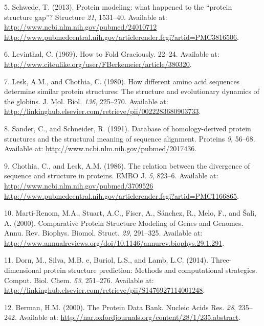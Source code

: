 \documentclass[11pt,a4paper,twoside]{book}
\theoremstyle{definition}
\theoremstyle{definition}
\theoremstyle{remark}
\begin{document}
\hypertarget{ref-Schwede2013}{}
5. Schwede, T. (2013). Protein modeling: what happened to the ``protein
structure gap''? Structure \emph{21}, 1531--40. Available at:
\href{http://www.ncbi.nlm.nih.gov/pubmed/24010712\%20http://www.pubmedcentral.nih.gov/articlerender.fcgi?artid=PMC3816506}{http://www.ncbi.nlm.nih.gov/pubmed/24010712 http://www.pubmedcentral.nih.gov/articlerender.fcgi?artid=PMC3816506}.

\hypertarget{ref-Levinthal1969}{}
6. Levinthal, C. (1969). How to Fold Graciously. 22--24. Available at:
\url{http://www.citeulike.org/user/FBerkemeier/article/380320}.

\hypertarget{ref-Lesk1980}{}
7. Lesk, A.M., and Chothia, C. (1980). How different amino acid
sequences determine similar protein structures: The structure and
evolutionary dynamics of the globins. J. Mol. Biol. \emph{136},
225--270. Available at:
\url{http://linkinghub.elsevier.com/retrieve/pii/0022283680903733}.

\hypertarget{ref-Sander1991}{}
8. Sander, C., and Schneider, R. (1991). Database of homology-derived
protein structures and the structural meaning of sequence alignment.
Proteins \emph{9}, 56--68. Available at:
\url{http://www.ncbi.nlm.nih.gov/pubmed/2017436}.

\hypertarget{ref-Chothia1986}{}
9. Chothia, C., and Lesk, A.M. (1986). The relation between the
divergence of sequence and structure in proteins. EMBO J. \emph{5},
823--6. Available at:
\href{http://www.ncbi.nlm.nih.gov/pubmed/3709526\%20http://www.pubmedcentral.nih.gov/articlerender.fcgi?artid=PMC1166865}{http://www.ncbi.nlm.nih.gov/pubmed/3709526 http://www.pubmedcentral.nih.gov/articlerender.fcgi?artid=PMC1166865}.

\hypertarget{ref-Marti-Renom2000}{}
10. Martí-Renom, M.A., Stuart, A.C., Fiser, A., Sánchez, R., Melo, F.,
and Šali, A. (2000). Comparative Protein Structure Modeling of Genes and
Genomes. Annu. Rev. Biophys. Biomol. Struct. \emph{29}, 291--325.
Available at:
\url{http://www.annualreviews.org/doi/10.1146/annurev.biophys.29.1.291}.

\hypertarget{ref-Dorn2014}{}
11. Dorn, M., Silva, M.B. e, Buriol, L.S., and Lamb, L.C. (2014).
Three-dimensional protein structure prediction: Methods and
computational strategies. Comput. Biol. Chem. \emph{53}, 251--276.
Available at:
\url{http://linkinghub.elsevier.com/retrieve/pii/S1476927114001248}.

\hypertarget{ref-Berman2000}{}
12. Berman, H.M. (2000). The Protein Data Bank. Nucleic Acids Res.
\emph{28}, 235--242. Available at:
\url{http://nar.oxfordjournals.org/content/28/1/235.abstract}.
\end{document}
